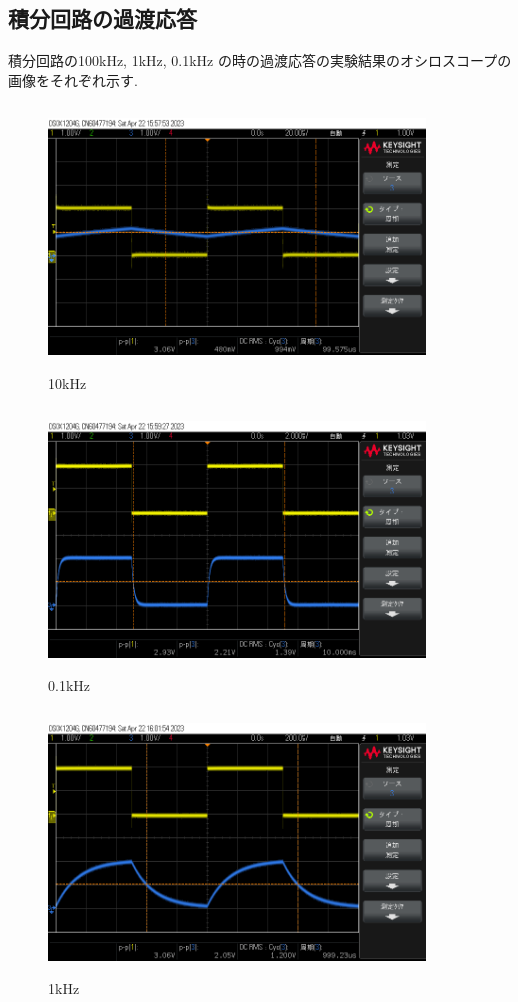 \documentclass[a4j,10pt,dvipdfmx]{jarticle}
\begin{document}
\subsection{積分回路の過渡応答}
積分回路の100kHz, 1kHz, 0.1kHz の時の過渡応答の実験結果のオシロスコープの画像をそれぞれ示す.
\begin{figure}[H]
  \begin{center}
  \includegraphics[height=7cm,width=10cm]{10khz.png}
  \caption{10kHz}
\end{center}
\end{figure}
\begin{figure}[H]
  \begin{center}
  \includegraphics[height=7cm,width=10cm]{100hz.png}
  \caption{0.1kHz}
\end{center}
\end{figure}
\begin{figure}[H]
  \begin{center}
  \includegraphics[height=7cm,width=10cm]{1khz.png}
  \caption{1kHz}
\end{center}
\end{figure}
\end{document}
